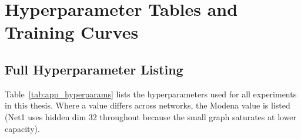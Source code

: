 \chapter{Hyperparameter Tables and Training Curves}
\label{app:hyperparameters}

\section{Full Hyperparameter Listing}
\label{app:hyperparams_table}

Table~\ref{tab:app_hyperparams} lists the hyperparameters used for
all experiments in this thesis. Where a value differs across
networks, the Modena value is listed (Net1 uses hidden dim 32
throughout because the small graph saturates at lower capacity).

